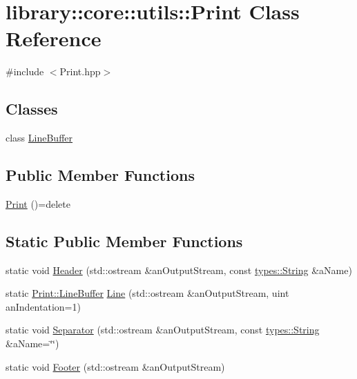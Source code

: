 \hypertarget{classlibrary_1_1core_1_1utils_1_1_print}{}\section{library\+::core\+::utils\+::Print Class Reference}
\label{classlibrary_1_1core_1_1utils_1_1_print}


{\ttfamily \#include $<$Print.\+hpp$>$}

\subsection*{Classes}
\begin{DoxyCompactItemize}
\item 
class \mbox{\hyperlink{classlibrary_1_1core_1_1utils_1_1_print_1_1_line_buffer}{Line\+Buffer}}
\end{DoxyCompactItemize}
\subsection*{Public Member Functions}
\begin{DoxyCompactItemize}
\item 
\mbox{\hyperlink{classlibrary_1_1core_1_1utils_1_1_print_a2d7ca0fac9e9dc7fa8b8b40f7b784198}{Print}} ()=delete
\end{DoxyCompactItemize}
\subsection*{Static Public Member Functions}
\begin{DoxyCompactItemize}
\item 
static void \mbox{\hyperlink{classlibrary_1_1core_1_1utils_1_1_print_a828afa2d09d997e2ad5b5a93ab81bcb0}{Header}} (std\+::ostream \&an\+Output\+Stream, const \mbox{\hyperlink{classlibrary_1_1core_1_1types_1_1_string}{types\+::\+String}} \&a\+Name)
\item 
static \mbox{\hyperlink{classlibrary_1_1core_1_1utils_1_1_print_1_1_line_buffer}{Print\+::\+Line\+Buffer}} \mbox{\hyperlink{classlibrary_1_1core_1_1utils_1_1_print_ab4d98c65fbb58213358df534dd1f6d65}{Line}} (std\+::ostream \&an\+Output\+Stream, uint an\+Indentation=1)
\item 
static void \mbox{\hyperlink{classlibrary_1_1core_1_1utils_1_1_print_a2c2f28c75ecbee13ea972f49ea4a3adb}{Separator}} (std\+::ostream \&an\+Output\+Stream, const \mbox{\hyperlink{classlibrary_1_1core_1_1types_1_1_string}{types\+::\+String}} \&a\+Name=\char`\"{}\char`\"{})
\item 
static void \mbox{\hyperlink{classlibrary_1_1core_1_1utils_1_1_print_a5c9f1797eafda1b8e8ef95d5a2902df2}{Footer}} (std\+::ostream \&an\+Output\+Stream)
\end{DoxyCompactItemize}


